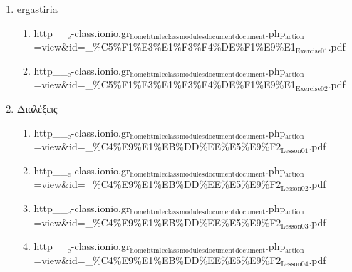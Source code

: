 \documentclass[11pt]{article}
\begin{document}
\begin{enumerate}
\begin{enumerate}
\begin{enumerate}
\begin{enumerate}
\begin{enumerate}
\item ergastiria
\label{sec-1-1-1-1-49-2-2-1-64-4-5-2}
\begin{enumerate}
\item http\_\_$_{\text{e}}$-class.ionio.gr$_{\text{home}}$$_{\text{html}}$$_{\text{eclass}}$$_{\text{modules}}$$_{\text{document}}$$_{\text{document}}$.php$_{\text{action}}$=view\&id=\_\%C5\%F1\%E3\%E1\%F3\%F4\%DE\%F1\%E9\%E1$_{\text{Exercise01}}$.pdf
\label{sec-1-1-1-1-49-2-2-1-64-4-5-2-1}

\item http\_\_$_{\text{e}}$-class.ionio.gr$_{\text{home}}$$_{\text{html}}$$_{\text{eclass}}$$_{\text{modules}}$$_{\text{document}}$$_{\text{document}}$.php$_{\text{action}}$=view\&id=\_\%C5\%F1\%E3\%E1\%F3\%F4\%DE\%F1\%E9\%E1$_{\text{Exercise02}}$.pdf
\label{sec-1-1-1-1-49-2-2-1-64-4-5-2-2}
\end{enumerate}

\item Διαλέξεις
\label{sec-1-1-1-1-49-2-2-1-64-4-5-3}
\begin{enumerate}
\item http\_\_$_{\text{e}}$-class.ionio.gr$_{\text{home}}$$_{\text{html}}$$_{\text{eclass}}$$_{\text{modules}}$$_{\text{document}}$$_{\text{document}}$.php$_{\text{action}}$=view\&id=\_\%C4\%E9\%E1\%EB\%DD\%EE\%E5\%E9\%F2$_{\text{Lesson01}}$.pdf
\label{sec-1-1-1-1-49-2-2-1-64-4-5-3-1}

\item http\_\_$_{\text{e}}$-class.ionio.gr$_{\text{home}}$$_{\text{html}}$$_{\text{eclass}}$$_{\text{modules}}$$_{\text{document}}$$_{\text{document}}$.php$_{\text{action}}$=view\&id=\_\%C4\%E9\%E1\%EB\%DD\%EE\%E5\%E9\%F2$_{\text{Lesson02}}$.pdf
\label{sec-1-1-1-1-49-2-2-1-64-4-5-3-2}

\item http\_\_$_{\text{e}}$-class.ionio.gr$_{\text{home}}$$_{\text{html}}$$_{\text{eclass}}$$_{\text{modules}}$$_{\text{document}}$$_{\text{document}}$.php$_{\text{action}}$=view\&id=\_\%C4\%E9\%E1\%EB\%DD\%EE\%E5\%E9\%F2$_{\text{Lesson03}}$.pdf
\label{sec-1-1-1-1-49-2-2-1-64-4-5-3-3}

\item http\_\_$_{\text{e}}$-class.ionio.gr$_{\text{home}}$$_{\text{html}}$$_{\text{eclass}}$$_{\text{modules}}$$_{\text{document}}$$_{\text{document}}$.php$_{\text{action}}$=view\&id=\_\%C4\%E9\%E1\%EB\%DD\%EE\%E5\%E9\%F2$_{\text{Lesson04}}$.pdf
\label{sec-1-1-1-1-49-2-2-1-64-4-5-3-4}
\end{enumerate}
\end{enumerate}


\end{enumerate}
\end{enumerate}
\end{enumerate}
\end{enumerate}
\end{document}
